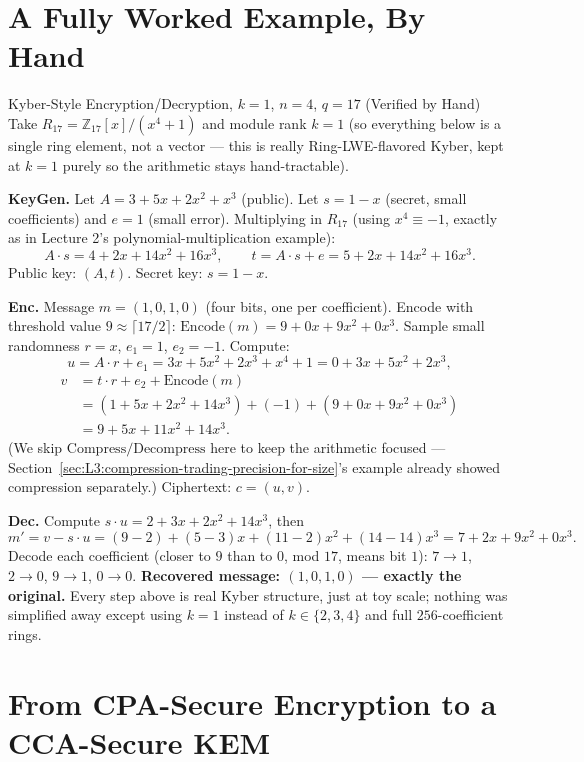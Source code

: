 \section{A Fully Worked Example, By Hand}
\label{sec:L3:a-fully-worked-example-by-hand}

\begin{exbox}{Kyber-Style Encryption/Decryption, $k=1$, $n=4$, $q=17$ (Verified by Hand)}
Take $R_{17} = \mathbb{Z}_{17}[x]/(x^4+1)$ and module rank $k=1$ (so everything below is a single ring element, not a vector --- this is really Ring-LWE-flavored Kyber, kept at $k=1$ purely so the arithmetic stays hand-tractable).

\textbf{KeyGen.} Let $A = 3+5x+2x^2+x^3$ (public). Let $s = 1-x$ (secret, small coefficients) and $e=1$ (small error). Multiplying in $R_{17}$ (using $x^4\equiv -1$, exactly as in Lecture 2's polynomial-multiplication example):
$$
A\cdot s = 4 + 2x + 14x^2 + 16x^3, \qquad t = A\cdot s + e = 5+2x+14x^2+16x^3.
$$
Public key: $(A,t)$. Secret key: $s = 1-x$.

\textbf{Enc.} Message $m = (1,0,1,0)$ (four bits, one per coefficient). Encode with threshold value $9 \approx \lceil 17/2\rceil$: $\mathrm{Encode}(m) = 9+0x+9x^2+0x^3$. Sample small randomness $r = x$, $e_1 = 1$, $e_2=-1$. Compute:
$$
u = A\cdot r + e_1 = 3x+5x^2+2x^3+x^4 + 1 = 0+3x+5x^2+2x^3,
$$
\begin{align*}
v &= t\cdot r + e_2 + \mathrm{Encode}(m) \\
  &= (1+5x+2x^2+14x^3) + (-1) + (9+0x+9x^2+0x^3) \\
  &= 9+5x+11x^2+14x^3.
\end{align*}
(We skip $\mathrm{Compress}/\mathrm{Decompress}$ here to keep the arithmetic focused --- Section~\ref{sec:L3:compression-trading-precision-for-size}'s example already showed compression separately.) Ciphertext: $c=(u,v)$.

\textbf{Dec.} Compute $s\cdot u = 2+3x+2x^2+14x^3$, then
$$
m' = v - s\cdot u = (9-2) + (5-3)x + (11-2)x^2 + (14-14)x^3 = 7+2x+9x^2+0x^3.
$$
Decode each coefficient (closer to $9$ than to $0$, mod $17$, means bit $1$): $7\to 1$, $2\to 0$, $9\to 1$, $0\to 0$. \textbf{Recovered message: $(1,0,1,0)$ --- exactly the original.} Every step above is real Kyber structure, just at toy scale; nothing was simplified away except using $k=1$ instead of $k\in\{2,3,4\}$ and full $256$-coefficient rings.
\end{exbox}

\section{From CPA-Secure Encryption to a CCA-Secure KEM}
\label{sec:L3:from-cpa-secure-encryption-to-a-cca-secu}

